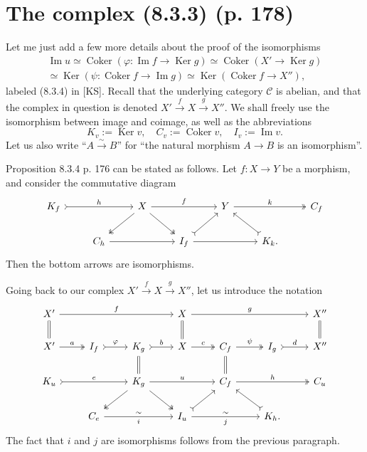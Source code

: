 \documentclass[12pt]{article}
\theoremstyle{remark}
\newcommand{\C}{\mathcal C}
\newcommand{\p}{\varphi}
\DeclareMathOperator{\Coker}{Coker}
\DeclareMathOperator{\Ima}{Im}
\DeclareMathOperator{\Ker}{Ker}
\begin{document}
\section{The complex (8.3.3) (p. 178)}%
%
Let me just add a few more details about the proof of the isomorphisms
\begin{equation}\label{834}
\begin{split}
\Ima u\simeq\Coker(\p:\Ima f\to\Ker g)\simeq\Coker(X'\to\Ker g)\\ 
\simeq\Ker(\psi:\Coker f\to\Ima g)\simeq\Ker(\Coker f\to X''),
\end{split}
\end{equation}
labeled (8.3.4) in [KS]. Recall that the underlying category $\C$ is abelian, and that the complex in question is denoted $X'\xrightarrow{f}X\xrightarrow{g}X''$. We shall freely use the isomorphism between image and coimage, as well as the abbreviations 
$$
K_v:=\Ker v,\quad C_v:=\Coker v,\quad I_v:=\Ima v.
$$ 
Let us also write ``$A\overset{\sim}{\to}B$'' for ``the natural morphism $A\to B$ is an isomorphism''. 

Proposition 8.3.4 p. 176 can be stated as follows. Let $f:X\to Y$ be a morphism, and consider the commutative diagram 
$$
\begin{tikzcd}
K_f\ar[tail]{rr}{h}&&X\ar{rr}{f}\ar[two heads]{dl}\ar[two heads]{dr}&&Y\ar[two heads]{rr}{k}&&C_f\\ 
&C_h\ar{rr}&&I_f\ar[tail]{ur}\ar{rr}&&K_k.\ar[tail]{ul}
\end{tikzcd}
$$ 
Then the bottom arrows are isomorphisms.  

Going back to our complex $X'\overset{f}{\to}X\overset{g}{\to}X''$, let us introduce the notation 
$$
\begin{tikzcd}
X'\ar{rrr}{f}\ar[equal]{d}&&&X\ar[equal]{d}\ar{rrr}{g}&&&X''\ar[equal]{d}\\ 
X'\ar[two heads]{r}{a}&I_f\ar[tail]{r}{\p}&K_g\ar[equal]{d}\ar[tail]{r}{b}&X\ar[two heads]{r}{c}&C_f\ar[equal]{d}\ar[two heads]{r}{\psi}&I_g\ar[tail]{r}{d}&X''\\ 
K_u\ar[tail]{rr}{e}&&K_g\ar[two heads]{dl}\ar[two heads]{dr}\ar{rr}{u}&&C_f\ar[two heads]{rr}{h}&&C_u\\ 
&C_e\ar{rr}{\sim}[swap]{i}&&I_u\ar[tail]{ur}\ar{rr}{\sim}[swap]{j}&&K_h.\ar[tail]{ul}
\end{tikzcd}
$$ 
The fact that $i$ and $j$ are isomorphisms follows from the previous paragraph. 
\end{document}
